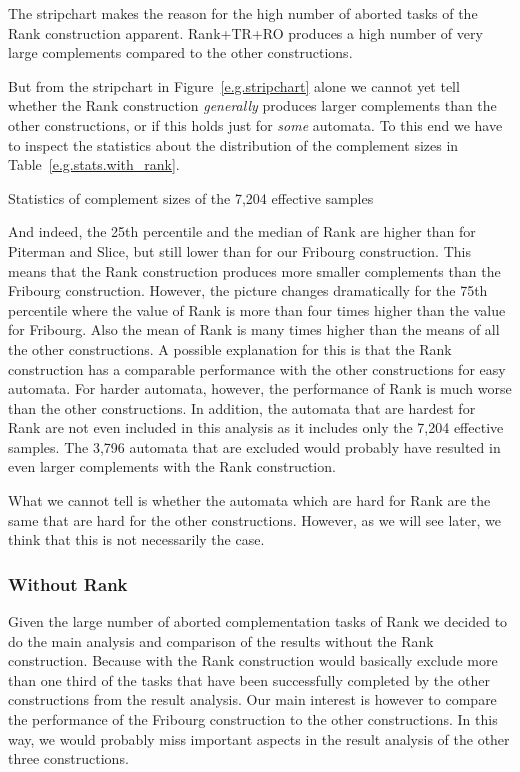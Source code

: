 The stripchart makes the reason for the high number of aborted tasks of the Rank construction apparent. Rank+TR+RO produces a high number of very large complements compared to the other constructions.

But from the stripchart in Figure~\ref{e.g.stripchart} alone we cannot yet tell whether the Rank construction \textit{generally} produces larger complements than the other constructions, or if this holds just for \textit{some} automata. To this end we have to inspect the statistics about the distribution of the complement sizes in Table~\ref{e.g.stats.with_rank}.

\begin{table}[ht]
\centering

\caption{Statistics of complement sizes of the 7,204 effective samples}
\label{e.g.stats.with_rank}
\end{table}

And indeed, the 25th percentile and the median of Rank are higher than for Piterman and Slice, but still lower than for our Fribourg construction. This means that the Rank construction produces more smaller complements than the Fribourg construction. However, the picture changes dramatically for the 75th percentile where the value of Rank is more than four times higher than the value for Fribourg. Also the mean of Rank is many times higher than the means of all the other constructions. A possible explanation for this is that the Rank construction has a comparable performance with the other constructions for easy automata. For harder automata, however, the performance of Rank is much worse than the other constructions. In addition, the automata that are hardest for Rank are not even included in this analysis as it includes only the 7,204 effective samples. The 3,796 automata that are excluded would probably have resulted in even larger complements with the Rank construction.

What we cannot tell is whether the automata which are hard for Rank are the same that are hard for the other constructions. However, as we will see later, we think that this is not necessarily the case.

\subsubsection{Without Rank}

Given the large number of aborted complementation tasks of Rank we decided to do the main analysis and comparison of the results without the Rank construction. Because with the Rank construction would basically exclude more than one third of the tasks that have been successfully completed by the other constructions from the result analysis. Our main interest is however to compare the performance of the Fribourg construction to the other constructions. In this way, we would probably miss important aspects in the result analysis of the other three constructions. 

